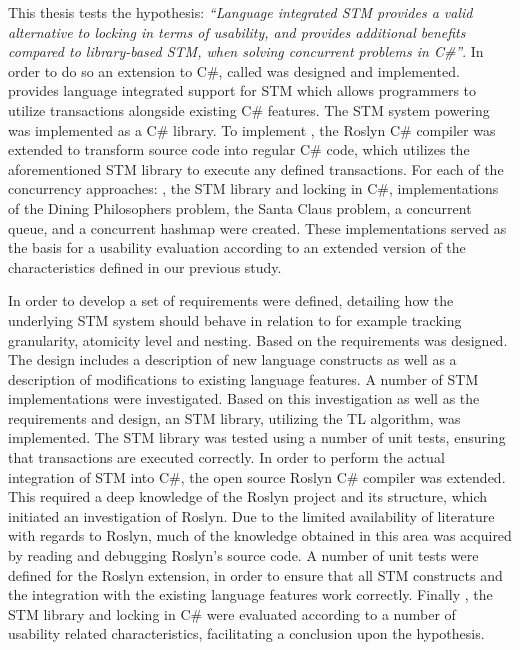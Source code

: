 \makeatletter {}\makeatother
{}

This thesis tests the hypothesis: \textit{``Language integrated \ac{STM} provides a valid alternative to locking in terms of usability, and provides additional benefits compared to library-based \ac{STM}, when solving concurrent problems in C\#''}. In order to do so an extension to C\#, called \stmname was designed and implemented. \stmname provides language integrated support for \ac{STM} which allows programmers to utilize transactions alongside existing C\# features. The \ac{STM} system powering \stmname was implemented as a C\# library. To implement \stmname, the Roslyn C\# compiler was extended to transform \stmname source code into regular C\# code, which utilizes the aforementioned \ac{STM} library to execute any defined transactions. For each of the concurrency approaches: \stmname, the \ac{STM} library and locking in C\#,  implementations of the Dining Philosophers problem, the Santa Claus problem, a concurrent queue, and a concurrent hashmap were created. These implementations served as the basis for a usability evaluation according to an extended version of the characteristics defined in our previous study\cite{dpt907e14trending}.

In order to develop \stmname a set of requirements were defined, detailing how the underlying \ac{STM} system should behave in relation to for example tracking granularity, atomicity level and nesting. Based on the requirements \stmname was designed. The design includes a description of new language constructs as well as a description of modifications to existing language features. A number of \ac{STM} implementations were investigated. Based on this investigation as well as the requirements and design, an \ac{STM} library, utilizing the TL algorithm, was implemented. The \ac{STM} library was tested using a number of unit tests, ensuring that transactions are executed correctly. In order to perform the actual integration of \ac{STM} into C\#, the open source Roslyn C\# compiler was extended. This required a deep knowledge of the Roslyn project and its structure, which initiated an investigation of Roslyn. Due to the limited availability of literature with regards to Roslyn, much of the knowledge obtained in this area was acquired by reading and debugging Roslyn's source code. A number of unit tests were defined for the Roslyn extension, in order to ensure that all \ac{STM} constructs and the integration with the existing language features work correctly. Finally \stmname, the \ac{STM} library and locking in C\# were evaluated according to a number of usability related characteristics, facilitating a conclusion upon the hypothesis.

